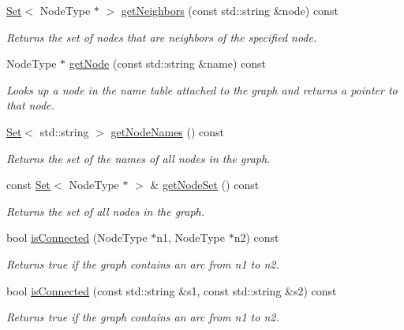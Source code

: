 \begin{DoxyCompactItemize}
\mbox{\hyperlink{classstanfordcpplib_1_1collections_1_1GenericSet}{Set}}$<$ Node\+Type $\ast$ $>$ \mbox{\hyperlink{classGraph_a3a3720906c380f36b50530419330bfe5}{get\+Neighbors}} (const std\+::string \&node) const
\begin{DoxyCompactList}\small\item\em Returns the set of nodes that are neighbors of the specified node. \end{DoxyCompactList}\item 
Node\+Type $\ast$ \mbox{\hyperlink{classGraph_a81487976cf0e576047333c85463c33aa}{get\+Node}} (const std\+::string \&name) const
\begin{DoxyCompactList}\small\item\em Looks up a node in the name table attached to the graph and returns a pointer to that node. \end{DoxyCompactList}\item 
\mbox{\hyperlink{classstanfordcpplib_1_1collections_1_1GenericSet}{Set}}$<$ std\+::string $>$ \mbox{\hyperlink{classGraph_a3c6f37932f377dd2bf4fec61343a916d}{get\+Node\+Names}} () const
\begin{DoxyCompactList}\small\item\em Returns the set of the names of all nodes in the graph. \end{DoxyCompactList}\item 
const \mbox{\hyperlink{classstanfordcpplib_1_1collections_1_1GenericSet}{Set}}$<$ Node\+Type $\ast$ $>$ \& \mbox{\hyperlink{classGraph_abd5552888f57aaa581099e8146c617c9}{get\+Node\+Set}} () const
\begin{DoxyCompactList}\small\item\em Returns the set of all nodes in the graph. \end{DoxyCompactList}\item 
bool \mbox{\hyperlink{classGraph_a54164ab847f3a5c7fe15d15ac95af443}{is\+Connected}} (Node\+Type $\ast$n1, Node\+Type $\ast$n2) const
\begin{DoxyCompactList}\small\item\em Returns {\ttfamily true} if the graph contains an arc from {\ttfamily n1} to {\ttfamily n2}. \end{DoxyCompactList}\item 
bool \mbox{\hyperlink{classGraph_a3623b7decbedc522041c2c39d3b14421}{is\+Connected}} (const std\+::string \&s1, const std\+::string \&s2) const
\begin{DoxyCompactList}\small\item\em Returns {\ttfamily true} if the graph contains an arc from {\ttfamily n1} to {\ttfamily n2}. \end{DoxyCompactList}\item 

\end{DoxyCompactItemize}
